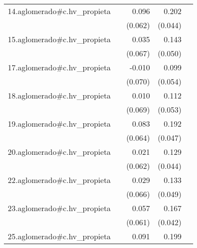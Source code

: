 {\begin{longtable}{l*{4}{D{.}{.}{-1}}}
\addlinespace
14.aglomerado#c.hv\_propieta&                     &       0.096         &       0.202\sym{***}&                     \\
            &                     &     (0.062)         &     (0.044)         &                     \\
\addlinespace
15.aglomerado#c.hv\_propieta&                     &       0.035         &       0.143\sym{**} &                     \\
            &                     &     (0.067)         &     (0.050)         &                     \\
\addlinespace
17.aglomerado#c.hv\_propieta&                     &      -0.010         &       0.099         &                     \\
            &                     &     (0.070)         &     (0.054)         &                     \\
\addlinespace
18.aglomerado#c.hv\_propieta&                     &       0.010         &       0.112\sym{*}  &                     \\
            &                     &     (0.069)         &     (0.053)         &                     \\
\addlinespace
19.aglomerado#c.hv\_propieta&                     &       0.083         &       0.192\sym{***}&                     \\
            &                     &     (0.064)         &     (0.047)         &                     \\
\addlinespace
20.aglomerado#c.hv\_propieta&                     &       0.021         &       0.129\sym{**} &                     \\
            &                     &     (0.062)         &     (0.044)         &                     \\
\addlinespace
22.aglomerado#c.hv\_propieta&                     &       0.029         &       0.133\sym{**} &                     \\
            &                     &     (0.066)         &     (0.049)         &                     \\
\addlinespace
23.aglomerado#c.hv\_propieta&                     &       0.057         &       0.167\sym{***}&                     \\
            &                     &     (0.061)         &     (0.042)         &                     \\
\addlinespace
25.aglomerado#c.hv\_propieta&                     &       0.091         &       0.199\sym{***}&                     \\

\end{longtable}}
